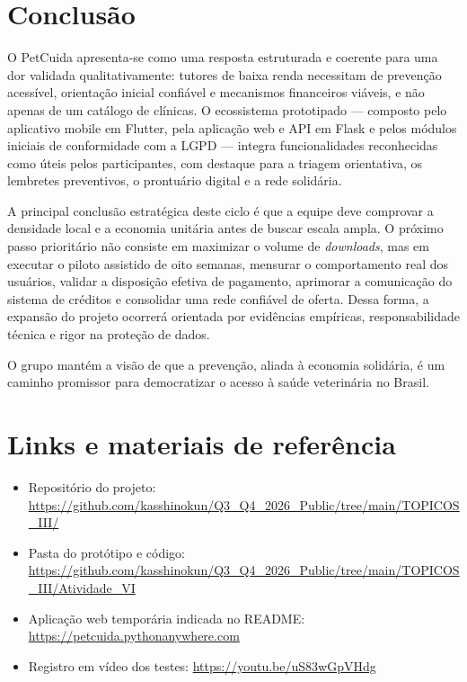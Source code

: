 \documentclass[12pt,a4paper]{article}
\begin{document}
\section{Conclusão}
O PetCuida apresenta-se como uma resposta estruturada e coerente para uma dor validada qualitativamente: tutores de baixa renda necessitam de prevenção acessível, orientação inicial confiável e mecanismos financeiros viáveis, e não apenas de um catálogo de clínicas. O ecossistema prototipado — composto pelo aplicativo mobile em Flutter, pela aplicação web e API em Flask e pelos módulos iniciais de conformidade com a LGPD — integra funcionalidades reconhecidas como úteis pelos participantes, com destaque para a triagem orientativa, os lembretes preventivos, o prontuário digital e a rede solidária.

A principal conclusão estratégica deste ciclo é que a equipe deve comprovar a densidade local e a economia unitária antes de buscar escala ampla. O próximo passo prioritário não consiste em maximizar o volume de \textit{downloads}, mas em executar o piloto assistido de oito semanas, mensurar o comportamento real dos usuários, validar a disposição efetiva de pagamento, aprimorar a comunicação do sistema de créditos e consolidar uma rede confiável de oferta. Dessa forma, a expansão do projeto ocorrerá orientada por evidências empíricas, responsabilidade técnica e rigor na proteção de dados.

O grupo mantém a visão de que a prevenção, aliada à economia solidária, é um caminho promissor para democratizar o acesso à saúde veterinária no Brasil.

\appendix
\section{Links e materiais de referência}
\begin{itemize}[leftmargin=*]
  \item Repositório do projeto: \url{https://github.com/kasshinokun/Q3_Q4_2026_Public/tree/main/TOPICOS_III/}
  \item Pasta do protótipo e código: \url{https://github.com/kasshinokun/Q3_Q4_2026_Public/tree/main/TOPICOS_III/Atividade_VI}
  \item Aplicação web temporária indicada no README: \url{https://petcuida.pythonanywhere.com}
  \item Registro em vídeo dos testes: \url{https://youtu.be/uS83wGpVHdg}
\end{itemize}
\end{document}
